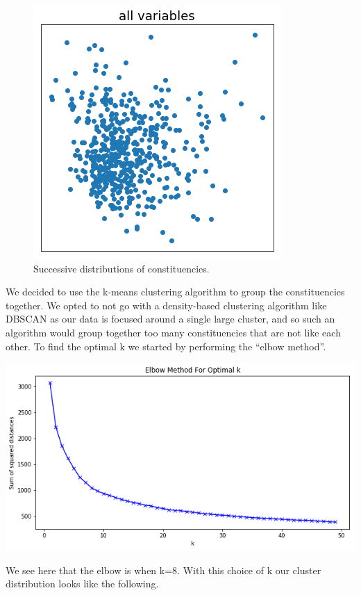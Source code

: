\documentclass[a4paper, 11pt]{article}
\begin{document}
\begin{figure}
\includegraphics[scale=.32]{../gfx/cluster6.png}
\caption{Successive distributions of constituencies.}
\end{figure}

We decided to use the k-means clustering algorithm to group the constituencies together. We opted to not go with a density-based clustering algorithm like DBSCAN as our data is focused around a single large cluster, and so such an algorithm would group together too many constituencies that are not like each other. To find the optimal k we started by performing the ``elbow method''.

\begin{center}
  \includegraphics[scale=.5]{../gfx/elbow0.png}
\end{center}

We see here that the elbow is when k=8. With this choice of k our cluster distribution looks like the following.
\end{document}
